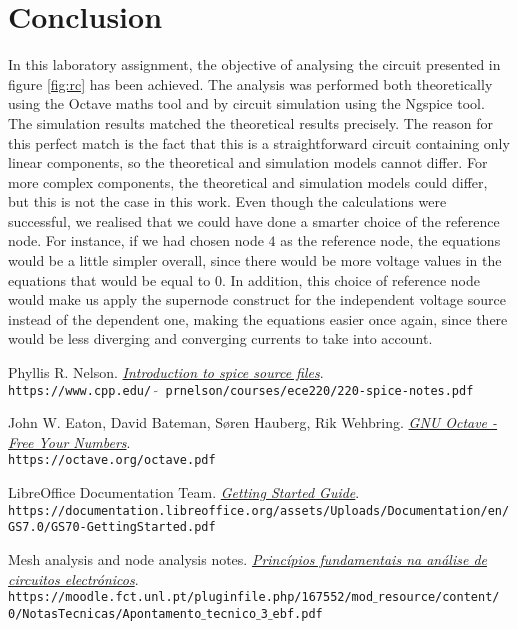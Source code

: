 \section{Conclusion}
\label{sec:conclusion}

In this laboratory assignment, the objective of analysing the circuit presented
in figure \ref{fig:rc} has been achieved. The analysis was performed both theoretically
using the Octave maths tool and by circuit simulation using the Ngspice tool.
The simulation results matched the theoretical results precisely.
The reason for this perfect match is the fact that this is a
straightforward circuit containing only linear components, so the theoretical
and simulation models cannot differ. For more complex components, the
theoretical and simulation models could differ, but this is not the case in this
work. Even though the calculations were successful, we realised that we could have 
done a smarter choice of the reference node. For instance, if we had chosen node $4$ as the reference node, 
the equations would be a little simpler overall, since there would be more voltage values in the equations that would 
be equal to $0$. In addition, this choice of reference node would make us apply the supernode construct for the independent 
voltage source instead of the dependent one, making the equations easier once again, since there would be less diverging and 
converging currents to take into account.

\begin{thebibliography}{9}

    Phyllis R. Nelson.
    \textit{\href{https://www.cpp.edu/~prnelson/courses/ece220/220-spice-notes.pdf}{Introduction to \emph{spice} source files}}.
    \\\texttt{https://www.cpp.edu/ $\tilde{}$ prnelson/courses/ece220/220-spice-notes.pdf}


    John W. Eaton, David Bateman, Søren Hauberg, Rik Wehbring.
    \textit{\href{https://octave.org/octave.pdf}{GNU Octave - Free Your Numbers}}.
    \\\texttt{https://octave.org/octave.pdf}

    LibreOffice Documentation Team.
    \textit{\href{https://documentation.libreoffice.org/assets/Uploads/Documentation/en/GS7.0/GS70-GettingStarted.pdf}{Getting Started Guide}}.
    \\\texttt{https://documentation.libreoffice.org/assets/Uploads/Documentation/en/
        GS7.0/GS70-GettingStarted.pdf}

    Mesh analysis and node analysis notes.
    \textit{\href{https://moodle.fct.unl.pt/pluginfile.php/167552/mod_resource/content/0/NotasTecnicas/Apontamento_tecnico_3_ebf.pdf}{Princípios fundamentais na análise de circuitos electrónicos}}.
    \\\texttt{https://moodle.fct.unl.pt/pluginfile.php/167552/mod$\_$resource/content/
        0/NotasTecnicas/Apontamento$\_$tecnico$\_$3$\_$ebf.pdf}

\end{thebibliography}
